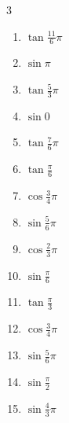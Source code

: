 \begin{multicols}{3}
\begin{enumerate}
  \item $\displaystyle \tan{\frac{11}{6}\pi}$

\columnbreak %

  \item $\displaystyle \sin{\pi}$
        \phantom{$\displaystyle =0$}

  \item $\displaystyle \tan{\frac{5}{3}\pi}$

  \item $\displaystyle \sin{0}$
        \phantom{$\displaystyle =0$}

  \item $\displaystyle \tan{\frac{7}{6}\pi}$

  \item $\displaystyle \tan{\frac{\pi}{6}}$

  \item $\displaystyle \cos{\frac{3}{4}\pi}$

  \item $\displaystyle \sin{\frac{5}{6}\pi}$

  \item $\displaystyle \cos{\frac{2}{3}\pi}$

  \item $\displaystyle \sin{\frac{\pi}{6}}$

  \item $\displaystyle \tan{\frac{\pi}{3}}$

  \item $\displaystyle \cos{\frac{3}{4}\pi}$

  \item $\displaystyle \sin{\frac{5}{6}\pi}$

  \item $\displaystyle \sin{\frac{\pi}{2}}$
        \phantom{$\displaystyle =1$}

  \item $\displaystyle \sin{\frac{4}{3}\pi}$


\end{enumerate}
\end{multicols}
